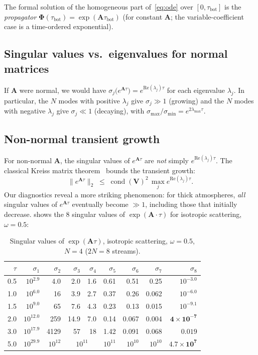 \documentclass[11pt,a4paper]{article}
\newcommand{\cond}{\operatorname{cond}}
\newcommand{\mat}[1]{\mathbf{#1}}
\newcommand{\tbot}{\tau_{\mathrm{bot}}}
\theoremstyle{definition}
\begin{document}
The formal solution of the homogeneous part of~\eqref{eq:ode} over
$[0,\tbot]$ is the \emph{propagator} $\mat{\Phi}(\tbot)=\exp(\mat{A}\tbot)$
(for constant $\mat{A}$; the variable-coefficient case is a time-ordered
exponential).

\subsection{Singular values vs.\ eigenvalues for normal matrices}
If $\mat{A}$ were normal, we would have
$\sigma_j\!\bigl(e^{\mat{A}\tau}\bigr)=e^{\text{Re}(\lambda_j)\tau}$ for
each eigenvalue $\lambda_j$.  In particular, the $N$ modes with positive
$\lambda_j$ give $\sigma_j\gg 1$ (growing) and the $N$ modes with negative
$\lambda_j$ give $\sigma_j\ll 1$ (decaying), with
$\sigma_{\max}/\sigma_{\min}=e^{2\lambda_{\max}\tau}$.

\subsection{Non-normal transient growth}\label{sec:transient}
For non-normal $\mat{A}$, the singular values of $e^{\mat{A}\tau}$ are
\emph{not} simply $e^{\text{Re}(\lambda_j)\tau}$.  The classical
Kreiss matrix theorem~\cite{kreiss1962} bounds the transient growth:
\[
  \|e^{\mat{A}\tau}\|_2 \;\leq\; \cond(\mat{V})^2\,\max_j e^{\text{Re}(\lambda_j)\tau}.
\]
Our diagnostics reveal a more striking phenomenon: for thick atmospheres,
\emph{all} singular values of $e^{\mat{A}\tau}$ eventually become $\gg 1$,
including those that initially decrease.   shows the
8 singular values of $\exp(\mat{A}\cdot\tau)$ for isotropic scattering,
$\omega=0.5$:

\begin{table}[h]\centering
\caption{Singular values of $\exp(\mat{A}\tau)$, isotropic scattering,
$\omega=0.5$, $N=4$ ($2N=8$ streams).}\label{tab:svd_tau5}
\begin{tabular}{r|rrrr|rrrr}
\toprule
$\tau$ & $\sigma_1$ & $\sigma_2$ & $\sigma_3$ & $\sigma_4$
       & $\sigma_5$ & $\sigma_6$ & $\sigma_7$ & $\sigma_8$ \\
\midrule
0.5  & $10^{2.9}$  & 4.0   & 2.0   & 1.6   & 0.61 & 0.51 & 0.25  & $10^{-3.0}$ \\
1.0  & $10^{6.0}$  & 16    & 3.9   & 2.7   & 0.37 & 0.26 & 0.062 & $10^{-6.0}$ \\
1.5  & $10^{9.0}$  & 65    & 7.6   & 4.3   & 0.23 & 0.13 & 0.015 & $10^{-9.1}$ \\
2.0  & $10^{12.0}$ & 259   & 14.9  & 7.0   & 0.14 & 0.067& 0.004 & $\mathbf{4\times 10^{-7}}$ \\
3.0  & $10^{17.9}$ & 4129  & 57    & 18    & 1.42 & 0.091& 0.068 & $\mathbf{0.019}$ \\
5.0  & $10^{29.9}$ & $10^{12}$ & \multicolumn{2}{c|}{$10^{11}$}
     & $10^{11}$ & $10^{10}$ & $10^{10}$ & $\mathbf{4.7\times 10^{7}}$ \\
\bottomrule
\end{tabular}
\end{table}
\end{document}
